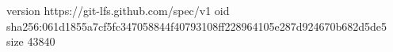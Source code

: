 version https://git-lfs.github.com/spec/v1
oid sha256:061d1855a7cf5fc347058844f40793108ff228964105e287d924670b682d5de5
size 43840
